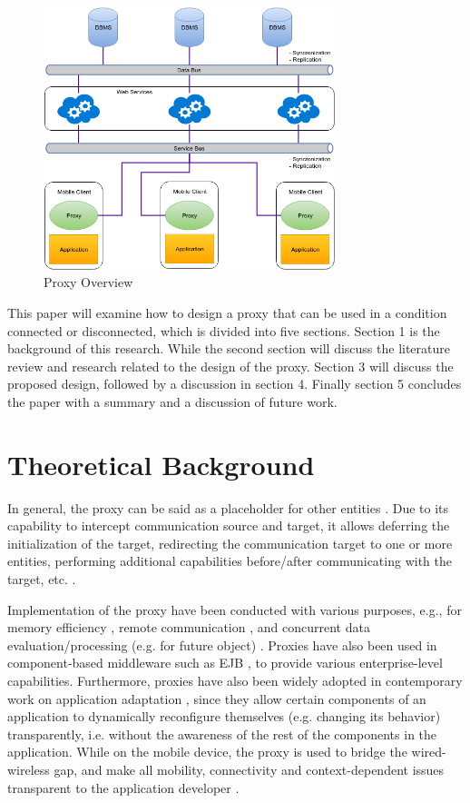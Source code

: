 \documentclass[conference]{IEEEtran}
\begin{document}
\begin{figure}
    \centering
    \includegraphics[width=8.5cm]{../../Resources/Images/proxy-overview}
    \caption{Proxy Overview}
    \label{fig:proxy-overview}
\end{figure}

This paper will examine how to design a proxy that can be used in a condition connected or disconnected, which is divided into five sections. Section 1 is the background of this research. While the second section will discuss the literature review and research related to the design of the proxy. Section 3 will discuss the proposed design, followed by a discussion in section 4. Finally section 5 concludes the paper with a summary and a discussion of future work.




\section{Theoretical Background}
In general, the proxy can be said as a placeholder for other entities \cite{gamma_design_1995}. Due to its capability to intercept communication source and target, it allows deferring the initialization of the target, redirecting the communication target to one or more entities, performing additional capabilities before/after communicating with the target, etc. \cite{gani_improving_2009}.

Implementation of the proxy have been conducted with various purposes, e.g., for memory efficiency \cite{gamma_design_1995}, remote communication \cite{wilson_get_2000}, and concurrent data evaluation/processing (e.g. for future object) \cite{pratikakis_transparent_2004}. Proxies have also been used in component-based middleware such as EJB \cite{_fusion_????}, to provide various enterprise-level capabilities. Furthermore, proxies have also been widely adopted in contemporary work on application adaptation \cite{holder_system_1999} \cite{philippsen_javaparty_1997} \cite{rubinsztejn_framework_2005} \cite{ryan_application_2004} \cite{tatsubori_bytecode_2001} \cite{tilevich_j-orchestra:_2002}, since they allow certain components of an application to dynamically reconfigure themselves (e.g. changing its behavior) transparently, i.e. without the awareness of the rest of the components in the application. While on the mobile device, the proxy is used to bridge the wired-wireless gap, and make all mobility, connectivity and context-dependent issues transparent to the application developer \cite{rubinsztejn_framework_2005}.
\end{document}
